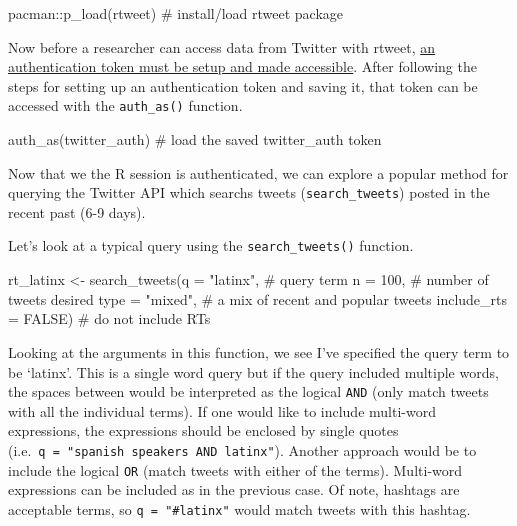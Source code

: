 \documentclass[
  letterpaper,
]{latex/krantz}
\newenvironment{Shaded}{\begin{snugshade}}{\end{snugshade}}
\newcommand{\AttributeTok}[1]{\textcolor[rgb]{0.40,0.45,0.13}{#1}}
\newcommand{\CommentTok}[1]{\textcolor[rgb]{0.37,0.37,0.37}{#1}}
\newcommand{\ConstantTok}[1]{\textcolor[rgb]{0.56,0.35,0.01}{#1}}
\newcommand{\DecValTok}[1]{\textcolor[rgb]{0.68,0.00,0.00}{#1}}
\newcommand{\FunctionTok}[1]{\textcolor[rgb]{0.28,0.35,0.67}{#1}}
\newcommand{\NormalTok}[1]{\textcolor[rgb]{0.00,0.23,0.31}{#1}}
\newcommand{\OtherTok}[1]{\textcolor[rgb]{0.00,0.23,0.31}{#1}}
\newcommand{\SpecialCharTok}[1]{\textcolor[rgb]{0.37,0.37,0.37}{#1}}
\newcommand{\StringTok}[1]{\textcolor[rgb]{0.13,0.47,0.30}{#1}}
\begin{document}
\begin{Shaded}
\begin{Highlighting}[]
\NormalTok{pacman}\SpecialCharTok{::}\FunctionTok{p\_load}\NormalTok{(rtweet) }\CommentTok{\# install/load rtweet package}
\end{Highlighting}
\end{Shaded}

Now before a researcher can access data from Twitter with rtweet,
\href{https://docs.ropensci.org/rtweet/articles/auth.html}{an
authentication token must be setup and made accessible}. After following
the steps for setting up an authentication token and saving it, that
token can be accessed with the \texttt{auth\_as()} function.

\begin{Shaded}
\begin{Highlighting}[]
\FunctionTok{auth\_as}\NormalTok{(twitter\_auth) }\CommentTok{\# load the saved \textasciigrave{}twitter\_auth\textasciigrave{} token}
\end{Highlighting}
\end{Shaded}

Now that we the R session is authenticated, we can explore a popular
method for querying the Twitter API which searchs tweets
(\texttt{search\_tweets}) posted in the recent past (6-9 days).

Let's look at a typical query using the \texttt{search\_tweets()}
function.

\begin{Shaded}
\begin{Highlighting}[]
\NormalTok{rt\_latinx }\OtherTok{\textless{}{-}} 
  \FunctionTok{search\_tweets}\NormalTok{(}\AttributeTok{q =} \StringTok{"latinx"}\NormalTok{, }\CommentTok{\# query term}
                \AttributeTok{n =} \DecValTok{100}\NormalTok{, }\CommentTok{\# number of tweets desired}
                \AttributeTok{type =} \StringTok{"mixed"}\NormalTok{, }\CommentTok{\# a mix of \textasciigrave{}recent\textasciigrave{} and \textasciigrave{}popular\textasciigrave{} tweets}
                \AttributeTok{include\_rts =} \ConstantTok{FALSE}\NormalTok{) }\CommentTok{\# do not include RTs}
\end{Highlighting}
\end{Shaded}

Looking at the arguments in this function, we see I've specified the
query term to be `latinx'. This is a single word query but if the query
included multiple words, the spaces between would be interpreted as the
logical \texttt{AND} (only match tweets with all the individual terms).
If one would like to include multi-word expressions, the expressions
should be enclosed by single quotes
(i.e.~\texttt{q\ =\ "\textquotesingle{}spanish\ speakers\textquotesingle{}\ AND\ latinx"}).
Another approach would be to include the logical \texttt{OR} (match
tweets with either of the terms). Multi-word expressions can be included
as in the previous case. Of note, hashtags are acceptable terms, so
\texttt{q\ =\ "\#latinx"} would match tweets with this hashtag.
\end{document}
